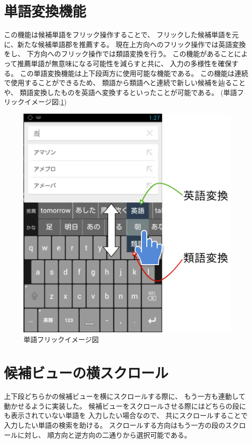 \section{単語変換機能}
\label{wordflick}
この機能は候補単語をフリック操作することで、
フリックした候補単語を元に、新たな候補単語郡を推薦する。
現在上方向へのフリック操作では英語変換をし、
下方向へのフリック操作では類語変換を行う。
この機能があることによって推薦単語が無意味になる可能性を減らすと共に、
入力の多様性を確保する。
この単語変換機能は上下段両方に使用可能な機能である。
この機能は連続で使用することができるため、
類語から類語へと連続で新しい候補を辿ることや、
類語変換したものを英語へ変換するといったことが可能である。
(単語フリックイメージ図:\ref{fig:wordflick})
\begin{figure}[htbp]
  \begin{center}
    \includegraphics[width=14cm,bb=0 0 461 485]{images/candidateflick.png}
  \end{center}
  \caption{単語フリックイメージ図}
  \label{fig:wordflick}
\end{figure}

\section{候補ビューの横スクロール}
上下段どちらかの候補ビューを横にスクロールする際に、
もう一方も連動して動かせるように実装した。
候補ビューをスクロールさせる際にはどちらの段にも表示されていない単語を
入力したい場合なので、
共にスクロールすることで入力したい単語の検索を助ける。
スクロールする方向はもう一方の段のスクロールに対し、
順方向と逆方向の二通りから選択可能である。

